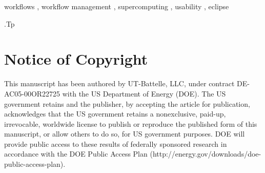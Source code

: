 \documentclass{elsart}
\begin{document}
\begin{frontmatter}
\begin{abstract}
\end{abstract}

\begin{keyword}
workflows
\sep 
workflow management
\sep
supercomputing
\sep
usability
\sep
eclipse

\vspace{1ex}

.Tp %

\end{keyword}

\end{frontmatter}

\section*{Notice of Copyright}

This manuscript has been authored by UT-Battelle, LLC, under contract DE-AC05-00OR22725 with the US Department of Energy (DOE). The US government retains and the publisher, by accepting the article for publication, acknowledges that the US government retains a nonexclusive, paid-up, irrevocable, worldwide license to publish or reproduce the published form of this manuscript, or allow others to do so, for US government purposes. DOE will provide public access to these results of federally sponsored research in accordance with the DOE Public Access Plan (http://energy.gov/downloads/doe-public-access-plan).





\end{document}
